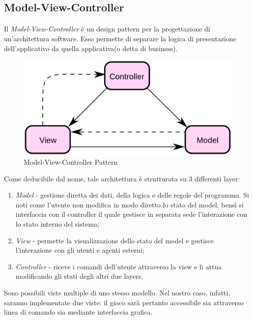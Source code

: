 \documentclass[a4paper, 12pt]{article}
\begin{document}
	\subsection{Model-View-Controller}
	\paragraph{}
	Il \emph{Model-View-Controller} è un design pattern per la progettazione di un'architettura software. Esso permette di separare la logica di presentazione dell'applicativo da quella applicativa(o detta di business).\\
	\begin{figure}[h!]
		\centering
		\includegraphics[scale=0.25]{mvc.png}
		\caption{Model-View-Controller Pattern}
	\end{figure}
	
	Come deducibile dal nome, tale architettura è strutturata su 3 differenti layer:\\
	\begin{enumerate}
		\item \emph{Model} - gestione diretta dei dati, della logica e delle regole del programma. Si noti come l'utente non modifica in modo diretto lo stato del model, bensì si interfaccia con il controller il quale gestisce in separata sede l'interazione con lo stato interno del sistema;
		\item \emph{View} - permette la visualizzazione dello stato del model e gestisce l'interazione con gli utenti e agenti esterni; 
		\item \emph{Controller} - riceve i comandi dell'utente attraverso la view e li attua modificando gli stati degli altri due layers.
	\end{enumerate}
	Sono possibili viste multiple di uno stesso modello. Nel nostro caso, infatti, saranno implementate due viste: il gioco sarà pertanto accessibile sia attraverso linea di comando sia mediante interfaccia grafica.
	
\end{document}
